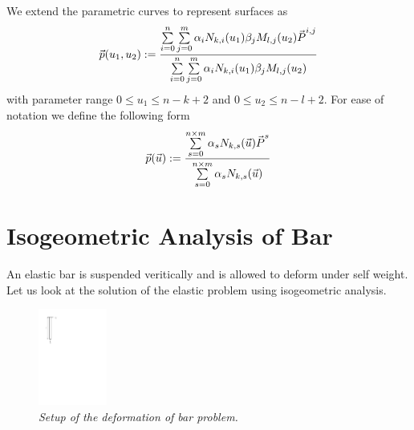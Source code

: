 \documentclass[submit,12pt]{aiaa-pretty} %
\begin{document}
We extend the parametric curves to represent surfaces as
\begin{equation}
  \vec{\mkern0mup}(u_1, u_2) := \dfrac{ {\sum\limits_{i=0}^{n} \sum\limits_{j=0}^{m} \alpha_i N_{k,i}(u_1) \beta_j M_{l,j}(u_2) \vec{\mkern0muP}^{i,j}}} {\sum\limits_{i=0}^{n} \sum\limits_{j=0}^{m} \alpha_i N_{k,i}(u_1) \beta_j M_{l,j}(u_2)}
\end{equation}
with parameter range $0 \le u_1 \le n - k + 2$ and $0 \le u_2 \le n - l + 2$. 
For ease of notation we define the following form
\begin{equation}
  \vec{\mkern0mup}(\vec{\mkern0muu}) := \dfrac{ {\sum \limits_{s=0}^{n \times m} \alpha_{s} N_{k,s}(\vec{\mkern0muu}) \vec{\mkern0muP}^{s}}} {\sum \limits_{s=0}^{n \times m} \alpha_{s} N_{k,s}(\vec{\mkern0muu})}
\end{equation}

\section{Isogeometric Analysis of Bar}

An elastic bar is suspended veritically and is allowed to deform under
self weight. Let us look at the solution of the elastic problem using
isogeometric analysis.
\begin{figure}[h] 
  \centering
  \includegraphics[width=0.2\textwidth]{bar-setup.pdf} 
  \caption{\emph{Setup of the deformation of bar problem.}}
  \label{fig:bar-setup}
\end{figure}
\end{document}
